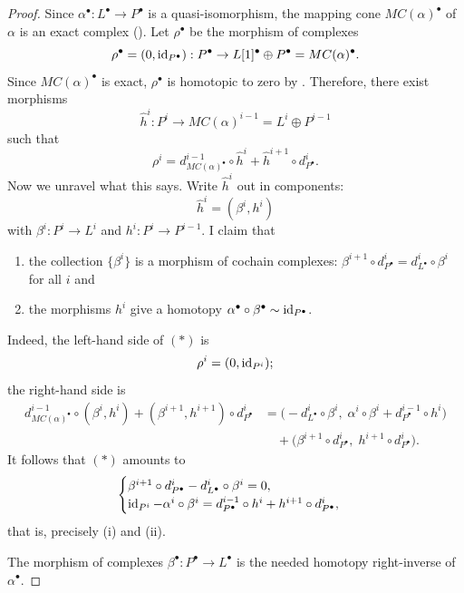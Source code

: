 \begin{proof}
  Since $\alpha^\bullet : L^\bullet \to P^\bullet$ is a
  quasi-isomorphism, the mapping cone $MC(\alpha)^\bullet$ of $\alpha$
  is an exact complex (). Let $\rho^\bullet$ be the
  morphism of complexes
  \[
    \rho^\bullet = (0, \operatorname{id}_{P^\bullet}) : P^\bullet \to L[1]^\bullet
    \oplus P^\bullet = MC(\alpha)^\bullet.
  \]
  Since $MC(\alpha)^\bullet$ is exact, $\rho^\bullet$ is homotopic to
  zero by . Therefore, there exist
  morphisms
  \[
    \hat h^i : P^i \to MC(\alpha)^{i-1} = L^i \oplus P^{i-1}
  \]
  such that
  \[
    \rho^i = d^{i-1}_{MC(\alpha)^\bullet} \circ \hat h^i + \hat
    h^{i+1} \circ d^i_{P^\bullet}. \tag{$*$}
  \]
  Now we unravel what this says. Write $\hat h^i$ out in components:
  \[
    \hat h^i = (\beta^i, h^i)
  \]
  with $\beta^i : P^i \to L^i$ and $h^i : P^i \to P^{i-1}$. I claim
  that
  \begin{enumerate}[label=(\roman*)]
  \item the collection $\{\beta^i\}$ is a morphism of cochain
    complexes:
    $\beta^{i+1} \circ d^i_{P^\bullet} = d^i_{L^\bullet} \circ
    \beta^i$ for all $i$ and
  \item the morphisms $h^i$ give a homotopy
    $\alpha^\bullet \circ \beta^\bullet \sim \operatorname{id}_{P^\bullet}$.
  \end{enumerate}
  Indeed, the left-hand side of $(*)$ is
  \[
    \rho^i = (0, \operatorname{id}_{P^i});
  \]
  the right-hand side is
  \begin{align*}
    d^{i-1}_{MC(\alpha)^\bullet} \circ (\beta^i, h^i) +
    (\beta^{i+1}, h^{i+1}) \circ d^i_{P^\bullet}
    &= \bigl(-d^i_{L^\bullet} \circ \beta^i,\; \alpha^i \circ
      \beta^i + d^{i-1}_{P^\bullet} \circ h^i\bigr) \\
    &\quad + \bigl(\beta^{i+1} \circ d^i_{P^\bullet},\; h^{i+1}
      \circ d^i_{P^\bullet}\bigr).
  \end{align*}
  It follows that $(*)$ amounts to
  \[
    \begin{cases}
      \beta^{i+1} \circ d^i_{P^\bullet} - d^i_{L^\bullet} \circ
      \beta^i = 0, \\
      \operatorname{id}_{P^i} - \alpha^i \circ \beta^i =
      d^{i-1}_{P^\bullet} \circ h^i + h^{i+1} \circ d^i_{P^\bullet},
    \end{cases}
  \]
  that is, precisely (i) and (ii).

  The morphism of complexes $\beta^\bullet : P^\bullet \to L^\bullet$
  is the needed homotopy right-inverse of $\alpha^\bullet$.
\end{proof}

